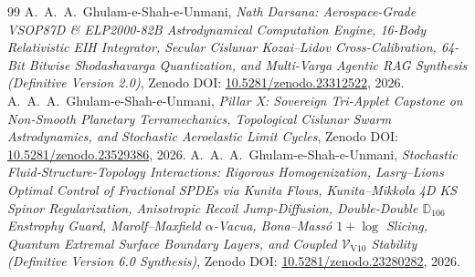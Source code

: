 \documentclass[11pt,a4paper,reqno]{article}
\theoremstyle{plain}
\theoremstyle{definition}
\theoremstyle{remark}
\numberwithin{equation}{section}
\numberwithin{table}{section}
\begin{document}
\begin{thebibliography}{99}
 A.~A.~A.~Ghulam-e-Shah-e-Unmani, \emph{Nath Darsana: Aerospace-Grade VSOP87D \& ELP2000-82B Astrodynamical Computation Engine, 16-Body Relativistic EIH Integrator, Secular Cislunar Kozai--Lidov Cross-Calibration, 64-Bit Bitwise Shodashavarga Quantization, and Multi-Varga Agentic RAG Synthesis (Definitive Version 2.0)}, Zenodo DOI: \href{https://doi.org/10.5281/zenodo.23312522}{10.5281/zenodo.23312522}, 2026.
 A.~A.~A.~Ghulam-e-Shah-e-Unmani, \emph{Pillar X: Sovereign Tri-Applet Capstone on Non-Smooth Planetary Terramechanics, Topological Cislunar Swarm Astrodynamics, and Stochastic Aeroelastic Limit Cycles}, Zenodo DOI: \href{https://doi.org/10.5281/zenodo.23529386}{10.5281/zenodo.23529386}, 2026.
 A.~A.~A.~Ghulam-e-Shah-e-Unmani, \emph{Stochastic Fluid-Structure-Topology Interactions: Rigorous Homogenization, Lasry--Lions Optimal Control of Fractional SPDEs via Kunita Flows, Kunita--Mikkola 4D KS Spinor Regularization, Anisotropic Recoil Jump-Diffusion, Double-Double $\mathbb{D}_{106}$ Enstrophy Guard, Marolf--Maxfield $\alpha$-Vacua, Bona--Mass\'o $1+\log$ Slicing, Quantum Extremal Surface Boundary Layers, and Coupled $\mathcal{V}_{\mathrm{V10}}$ Stability (Definitive Version 6.0 Synthesis)}, Zenodo DOI: \href{https://doi.org/10.5281/zenodo.23280282}{10.5281/zenodo.23280282}, 2026.
\end{thebibliography}
\end{document}
